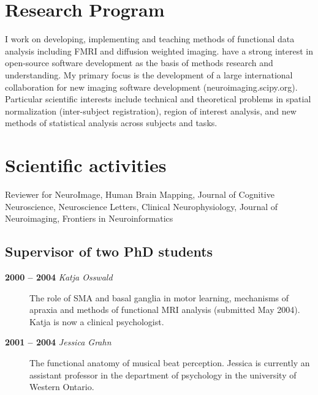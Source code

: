 \documentclass[letterpaper,11pt,openany]{sphinxhowto}
\begin{document}
\section{Research Program}
\label{research/cv_wrapper:research-program}
I work on developing, implementing and teaching methods of functional data
analysis including FMRI and diffusion weighted imaging.  have a strong interest
in open-source software development as the basis of methods research and
understanding.  My primary focus is the development of a large international
collaboration for new imaging software development (neuroimaging.scipy.org).
Particular scientific interests include technical and theoretical problems in
spatial normalization (inter-subject registration), region of interest analysis,
and new methods of statistical analysis across subjects and tasks.


\section{Scientific activities}
\label{research/cv_wrapper:scientific-activities}
Reviewer for NeuroImage, Human Brain Mapping, Journal of Cognitive Neuroscience,
Neuroscience Letters, Clinical Neurophysiology, Journal of Neuroimaging,
Frontiers in Neuroinformatics


\subsection{Supervisor of two PhD students}
\label{research/cv_wrapper:supervisor-of-two-phd-students}\begin{description}
\item[{\textbf{2000 – 2004} \emph{Katja Osswald}}] \leavevmode
The role of SMA and basal ganglia in motor learning, mechanisms of apraxia
and methods of functional MRI analysis (submitted May 2004).  Katja is now a
clinical psychologist.

\item[{\textbf{2001 – 2004} \emph{Jessica Grahn}}] \leavevmode
The functional anatomy of musical beat perception. Jessica is currently an
assistant professor in the department of psychology in the university of
Western Ontario.

\end{description}
\end{document}
